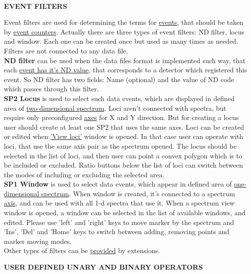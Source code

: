 \documentclass[a4paper]{article}
\begin{document}
%
\hypertarget{filters}{\\}
\begin{center}\textbf{EVENT FILTERS}\end{center}
{
Event filters are used for determining the terms for \hyperlink{datafile}{events}, that should be taken by \hyperlink{counters}{event counters}.
Actually there are three types of event filters: ND filter, locus and window. 
Each one can be created once but used as many times as needed.
Filters are not connected to any data file.
\hypertarget{ndfilter}{\\}
\textbf{ND filter} can  be used when the data files format is implemented such way, that each \hyperlink{datafile}{event has it's ND value}, that corresponds to a detector which registered this event. 
So ND filter has two fields: Name (optional) and the value of ND code which passes through this filter.
\hypertarget{loc}{\\}
\textbf{SP2 Locus} is used to select such data events, which are displayed in defined area of \hyperlink{sp2}{two-dimensional spectrum}. 
Loci aren't connected with spectra, but require only preconfigured \hyperlink{axis}{axes} for X and Y direction. 
But for creating a locus user should create at least one SP2 that uses the same axes.
Loci can be created or edited when \hyperlink{sp2}{'View loci'} window is opened.
In that case user can operate with loci, that use the same axis pair as the spectrum opened.
The locus should be selected in the list of loci, and then user can point a convex polygon which is to be included or excluded. 
Ratio buttons below the list of loci can switch between the modes of including or excluding the selected area.
\hypertarget{win}{\\}
\textbf{SP1 Window} is used to select data events, which appear in defined area of \hyperlink{sp1}{one-dimensional spectrum}. 
When window is created, it's connected to a spectrum \hyperlink{axis}{axis}, and can be used with all 1-d spectra that use it.
When a spectrum view window is opened, a window can be selected in the list of available windows, and edited. 
Please use 'left' and 'right' keys to move marker by the spectrum and 'Ins', 'Del' and 'Home' keys to switch between adding, removing points and marker moving modes.
\\
Other types of filters can be \hyperlink{devtool}{provided} by extensions.
}
%
\hypertarget{userbinary}{\\}
\begin{center}\textbf{USER DEFINED UNARY AND BINARY OPERATORS}\end{center}
\end{document}
